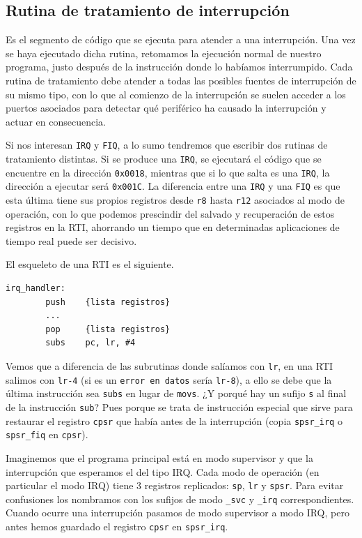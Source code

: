 \subsection{Rutina de tratamiento de interrupción}

Es el segmento de código que se ejecuta para atender a una interrupción. Una vez se haya
ejecutado dicha rutina, retomamos la ejecución normal de nuestro programa, justo después de la instrucción
donde lo habíamos interrumpido. Cada rutina de tratamiento debe atender a todas las posibles
fuentes de interrupción de su mismo tipo, con lo que al comienzo de la interrupción se suelen
acceder a los puertos asociados para detectar qué periférico ha causado la interrupción y
actuar en consecuencia.

Si nos interesan {\tt IRQ} y {\tt FIQ}, a lo sumo tendremos que escribir dos
rutinas de tratamiento distintas. Si se produce una {\tt IRQ}, se ejecutará el código
que se encuentre en la dirección {\tt 0x0018}, mientras que si lo que salta es una {\tt IRQ},
la dirección a ejecutar será {\tt 0x001C}. La diferencia entre una {\tt IRQ} y una
{\tt FIQ} es que esta última tiene sus propios registros desde {\tt r8} hasta {\tt r12}
asociados al modo de operación, con lo que podemos prescindir del salvado y recuperación
de estos registros en la RTI, ahorrando un tiempo que en determinadas aplicaciones de
tiempo real puede ser decisivo.

El esqueleto de una RTI es el siguiente.

\begin{lstlisting}
irq_handler:
        push    {lista registros}
        ...
        pop     {lista registros}
        subs    pc, lr, #4
\end{lstlisting}

Vemos que a diferencia de las subrutinas donde salíamos con {\tt lr}, en una RTI salimos
con {\tt lr-4} (si es un {\tt error en datos} sería {\tt lr-8}), a ello se debe que la última
instrucción sea {\tt subs} en lugar de {\tt movs}.
¿Y porqué hay un sufijo {\tt s} al final
de la instrucción {\tt sub}? Pues porque se trata de instrucción especial que sirve para
restaurar el registro {\tt cpsr} que había antes de la interrupción (copia {\tt spsr\_irq} o
{\tt spsr\_fiq} en {\tt cpsr}).

Imaginemos que el programa principal está en modo supervisor y que la interrupción que
esperamos el del tipo IRQ.
Cada modo de operación (en particular el modo IRQ) tiene 3 registros replicados: {\tt sp}, {\tt lr} y {\tt spsr}.
Para evitar confusiones los nombramos con los sufijos de modo {\tt \_svc} y {\tt \_irq} correspondientes.
Cuando ocurre una interrupción pasamos de modo supervisor a modo IRQ, pero antes hemos guardado
el registro {\tt cpsr} en {\tt spsr\_irq}.

